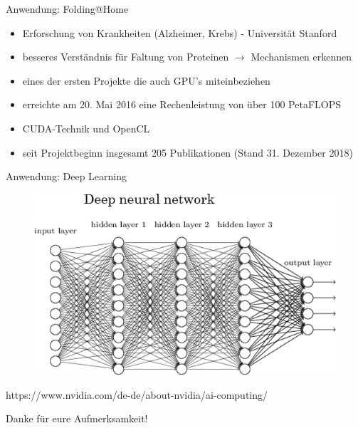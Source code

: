 \documentclass[10pt,aspectratio=169]{beamer}
\begin{document}
\begin{frame}{Anwendung: Folding@Home}
    \begin{itemize}
        \item Erforschung von Krankheiten (Alzheimer, Krebs) - Universität Stanford
        \item besseres Verständnis für Faltung von Proteinen $ \rightarrow $  Mechanismen erkennen
        \item eines der ersten Projekte die auch GPU's miteinbeziehen
         \item erreichte am 20. Mai 2016 eine Rechenleistung von über 100 PetaFLOPS
         \item CUDA-Technik und OpenCL
        \item seit Projektbeginn insgesamt  205 Publikationen (Stand 31. Dezember 2018)

    \end{itemize}
\end{frame}

\begin{frame}{Anwendung: Deep Learning}
    \begin{figure}[ht]
        \begin{center}
            \includegraphics[height=0.8\textheight]{slide5.png}
        \end{center}
    \end{figure}
\end{frame}


{
\begin{frame}[plain]
\vspace{8cm}
\centering
\footnotesize{https://www.nvidia.com/de-de/about-nvidia/ai-computing/}
\end{frame}
}

\begin{frame}[standout]
   
Danke für eure Aufmerksamkeit!

\end{frame}
\end{document}
